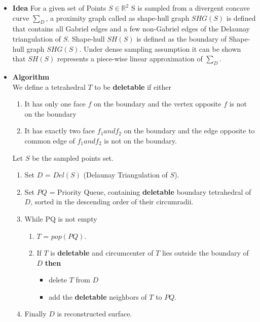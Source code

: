 \documentclass[preprint,5p,times,twocolumn]{elsarticle}
\begin{document}
\begin{itemize}
	\item \textbf{Idea} For a given set of Points $S \in \mathbb{R}^2$ S is sampled	from a divergent concave curve $\sum_D$, a proximity graph called as shape-hull graph $SHG(S)$ is defined that contains all Gabriel edges and a few non-Gabriel edges of the Delaunay triangulation of $S$. Shape-hull $SH(S)$ is defined as the boundary of Shape-hull graph $SHG(S)$. Under dense sampling assumption it can be shown that $SH(S)$ represents a piece-wise linear approximation of $\sum_D$.
	
	\item \textbf{Algorithm}\\
    We define a tetrahedral $T$ to be \textbf{deletable} if either 
    \begin{enumerate}    
    \item It has only one face $f$ on the boundary and the vertex opposite $f$ is not on the boundary
    \item It has exactly two face $f_1 and f_2$ on the boundary and the edge opposite to common edge of $f_1 and f_2$ is not on the boundary. 
    \end{enumerate}
     Let $S$ be the sampled points set.
     \begin{enumerate}
     \item Set $D$ =  $Del(S)$ (Delaunay Triangulation of $S$).
     \item Set $PQ$ = Priority Queue,  containing \textbf{deletable} boundary tetrahedral of $D$, sorted in the descending order of their circumradii.
     \item While PQ is not empty
     	\begin{enumerate}
        	\item $T$  = $pop(PQ)$. 
            \item If $T$ is \textbf{deletable} and circumcenter of $T$ lies outside the boundary of $D$ \textbf{then}
			\begin{itemize}
				\item delete $T$ from $D$
				\item add the \textbf{deletable} neighbors of $T$ to $PQ$.
			\end{itemize}
        \end{enumerate}
	\item Finally $D$ is  reconstructed surface.
    \end{enumerate}
    

\end{itemize}
\end{document}
